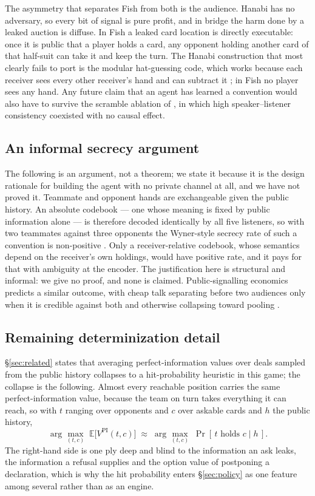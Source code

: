 The asymmetry that separates Fish from both is the audience. Hanabi has no
adversary, so every bit of signal is pure profit, and in bridge the harm done
by a leaked auction is diffuse. In Fish a leaked card location is directly
executable: once it is public that a player holds a card, any opponent holding
another card of that half-suit can take it and keep the turn. The Hanabi
construction that most clearly fails to port is the modular hat-guessing code,
which works because each receiver sees every other receiver's hand and can
subtract it \cite{cox-hanabi}; in Fish no player sees any hand. Any future
claim that an agent has learned a convention would also have to survive the
scramble ablation of \cite{lowe-pitfalls}, in which high speaker--listener
consistency coexisted with no causal effect.

\subsection{An informal secrecy argument}

The following is an argument, not a theorem; we state it because it is the
design rationale for building the agent with no private channel at all, and we
have not proved it. Teammate and opponent hands are exchangeable given the
public history. An absolute codebook --- one whose meaning is fixed by public
information alone --- is therefore decoded identically by all five listeners,
so with two teammates against three opponents the Wyner-style secrecy rate of
such a convention is non-positive \cite{wyner,csiszar-korner}. Only a
receiver-relative codebook, whose semantics depend on the receiver's own
holdings, would have positive rate, and it pays for that with ambiguity at the
encoder. The justification here is structural and informal: we give no proof,
and none is claimed. Public-signalling economics predicts a similar outcome,
with cheap talk separating before two audiences only when it is credible
against both and otherwise collapsing toward pooling \cite{farrell-gibbons}.

\subsection{Remaining determinization detail}

\S\ref{sec:related} states that averaging perfect-information values over deals
sampled from the public history collapses to a hit-probability heuristic in this
game; the collapse is the following. Almost every reachable position carries the
same perfect-information value, because the team on turn takes everything it can
reach, so with $t$ ranging over opponents and $c$ over askable cards and $h$ the
public history,
\[
  \arg\max_{(t,c)} \; \mathbb{E}\bigl[V^{\mathrm{PI}}(t,c)\bigr]
  \;\approx\;
  \arg\max_{(t,c)} \; \Pr[\,t \text{ holds } c \mid h\,].
\]
The right-hand side is one ply deep and blind to the information an ask leaks,
the information a refusal supplies and the option value of postponing a
declaration, which is why the hit probability enters \S\ref{sec:policy} as one
feature among several rather than as an engine.

